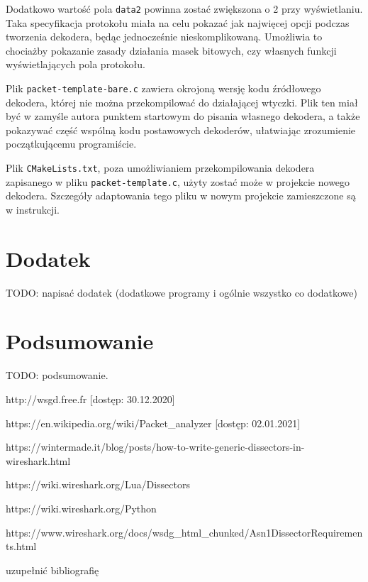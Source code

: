 \documentclass[a4paper, 12pt, twoside, openright]{article}
\begin{document}
	Dodatkowo wartość pola \texttt{data2} powinna zostać zwiększona o 2 przy wyświetlaniu. Taka specyfikacja protokołu
	miała na celu pokazać jak najwięcej opcji podczas tworzenia dekodera, będąc jednocześnie nieskomplikowaną.
	Umożliwia to chociażby pokazanie zasady działania masek bitowych, czy własnych funkcji wyświetlających pola protokołu.

	Plik \texttt{packet-template-bare.c} zawiera okrojoną wersję kodu źródłowego dekodera, której nie można przekompilować
	do działającej wtyczki. Plik ten miał być w zamyśle autora punktem startowym do pisania własnego dekodera, a także
	pokazywać część wspólną kodu postawowych dekoderów, ułatwiając zrozumienie początkującemu programiście.

	Plik \texttt{CMakeLists.txt}, poza umożliwianiem przekompilowania dekodera zapisanego w pliku \texttt{packet-template.c},
	użyty zostać może w projekcie nowego dekodera. Szczegóły adaptowania tego pliku w nowym projekcie zamieszczone są w instrukcji.



\newpage
\section{Dodatek}

	TODO: napisać dodatek (dodatkowe programy i ogólnie wszystko co dodatkowe)

\newpage
\section{Podsumowanie}

	TODO: podsumowanie.

\newpage

\begin{thebibliography}{99}

		http://wsgd.free.fr [dostęp: 30.12.2020]

		https://en.wikipedia.org/wiki/Packet\_analyzer [dostęp: 02.01.2021]

		https://wintermade.it/blog/posts/how-to-write-generic-dissectors-in-wireshark.html

		https://wiki.wireshark.org/Lua/Dissectors

		https://wiki.wireshark.org/Python

		https://www.wireshark.org/docs/wsdg\_html\_chunked/Asn1DissectorRequirements.html

		uzupełnić bibliografię


\end{thebibliography}


\vspace{85mm}
\end{document}
